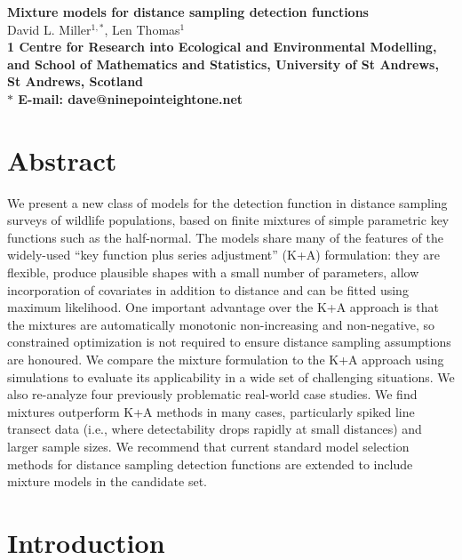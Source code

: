 \documentclass[10pt]{article}
\date{}
\begin{document}
\begin{flushleft}
{\Large
\textbf{Mixture models for distance sampling detection functions}
}
\\
David L. Miller$^{1,\ast}$,
Len Thomas$^{1}$
\\
\bf{1} Centre for Research into Ecological and Environmental Modelling, and School of Mathematics and Statistics, University of St Andrews, St Andrews, Scotland
\\
$\ast$ E-mail: dave@ninepointeightone.net
\end{flushleft}

\section*{Abstract}

We present a new class of models for the detection function in distance sampling surveys of wildlife populations, based on finite mixtures of simple parametric key functions such as the half-normal. The models share many of the features of the widely-used ``key function plus series adjustment'' (K+A) formulation: they are flexible, produce plausible shapes with a small number of parameters, allow incorporation of covariates in addition to distance and can be fitted using maximum likelihood. One important advantage over the K+A approach is that the mixtures are automatically monotonic non-increasing and non-negative, so constrained optimization is not required to ensure distance sampling assumptions are honoured. We compare the mixture formulation to the K+A approach using simulations to evaluate its applicability in a wide set of challenging situations. We also re-analyze four previously problematic real-world case studies.  We find mixtures outperform K+A methods in many cases, particularly spiked line transect data (i.e., where detectability drops rapidly at small distances) and larger sample sizes.  We recommend that current standard model selection methods for distance sampling detection functions are extended to include mixture models in the candidate set.


\section*{Introduction}
\end{document}
